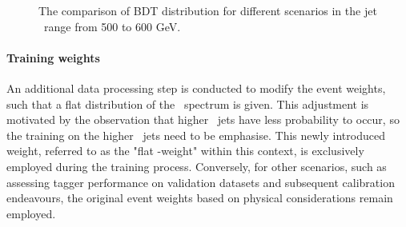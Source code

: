 \begin{figure}[htb]
	\centering
	 \quad
	\caption[]{
		The comparison of BDT distribution for different scenarios in the jet \pt~range from 500 to 600 GeV. %
		\label{fig:QG-training_scenario_compare_500_600}
	}
\end{figure}

\paragraph{Training weights\\}
An additional data processing step is conducted to modify the event weights, such that a flat distribution of the \pt~spectrum is given. 
This adjustment is motivated by the observation that higher \pt~jets have less probability to occur, so the training on the higher \pt~jets need to be emphasise. This newly introduced weight, referred to as the "flat \pt-weight" within this context, is exclusively employed during the training process. Conversely, for other scenarios, such as assessing tagger performance on validation datasets and subsequent calibration endeavours, the original event weights based on physical considerations remain employed.

